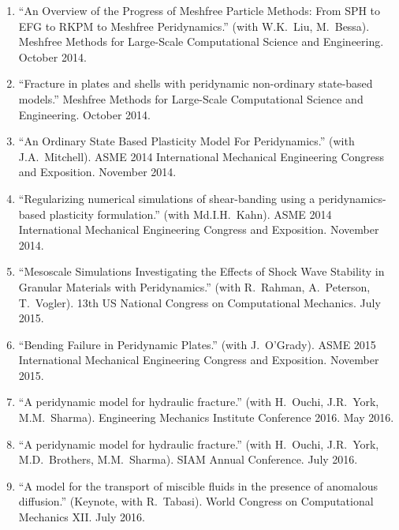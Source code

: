\begin{enumerate}[resume]
    \item ``An Overview of the Progress of Meshfree Particle Methods: From SPH to EFG to RKPM to Meshfree Peridynamics.'' (with W.K.~Liu, M.~Bessa). Meshfree Methods for Large-Scale Computational Science and Engineering. October 2014.
    \item ``Fracture in plates and shells with peridynamic non-ordinary state-based models.''  Meshfree Methods for Large-Scale Computational Science and Engineering. October 2014.
    \item ``An Ordinary State Based Plasticity Model For Peridynamics.'' (with J.A.~Mitchell). ASME 2014 International Mechanical Engineering Congress and Exposition. November 2014.
    \item ``Regularizing numerical simulations of shear-banding using a peridynamics-based plasticity formulation.'' (with Md.I.H.~Kahn). ASME 2014 International Mechanical Engineering Congress and Exposition. November 2014.
    \item ``Mesoscale Simulations Investigating the Effects of Shock Wave Stability in Granular Materials with Peridynamics.'' (with R.~Rahman, A.~Peterson, T.~Vogler). 13th US National Congress on Computational Mechanics. July 2015.
    \item ``Bending Failure in Peridynamic Plates.'' (with J.~O'Grady). ASME 2015 International Mechanical Engineering Congress and Exposition. November 2015.
    \item ``A peridynamic model for hydraulic fracture.'' (with H.\ Ouchi, J.R.\ York, M.M.\ Sharma). Engineering Mechanics Institute Conference 2016. May 2016.
    \item ``A peridynamic model for hydraulic fracture.'' (with H.\ Ouchi, J.R.\ York, M.D.\ Brothers, M.M.\ Sharma). SIAM Annual Conference.  July 2016.
    \item ``A model for the transport of miscible fluids in the presence of anomalous diffusion.'' (Keynote, with R.\ Tabasi). World Congress on Computational Mechanics XII.  July 2016.
\end{enumerate}
\else
\ifdefined\ispdf

